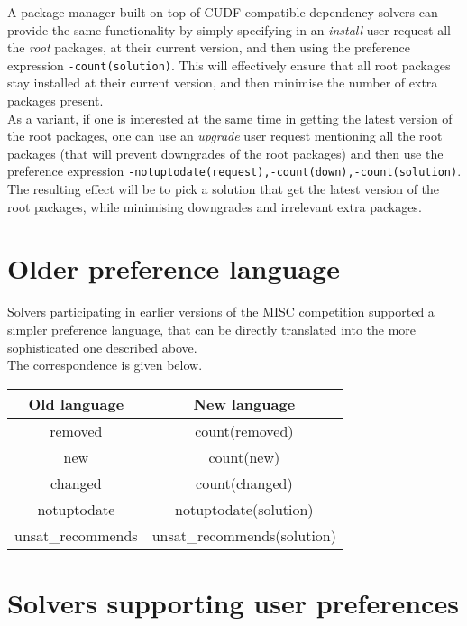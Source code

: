 \documentclass{article}
\begin{document}
A package manager built on top of CUDF-compatible dependency solvers can provide
the same functionality by simply specifying in an \emph{install} user request all the
\emph{root} packages, at their current version, and then using the preference
expression \texttt{-count(solution)}. 
%
This will effectively ensure that all root packages stay installed at their
current version, and then minimise the number of extra packages present.\\

As a variant, if one is interested at the same time in getting the latest version
of the root packages, one can use an \emph{upgrade} user request mentioning
all the root packages (that will prevent downgrades of the root packages) and
then use the preference expression \texttt{-notuptodate(request),-count(down),-count(solution)}.
The resulting effect will be to pick a solution that get the latest version
of the root packages, while minimising downgrades and irrelevant extra packages.

\section{Older preference language}

Solvers participating in earlier versions of the MISC competition supported a simpler preference language,
that can be directly translated into the more sophisticated one described above.\\

The correspondence is given below.\\

\begin{center}
\begin{tabular}{|c|c|}
\hline
Old language & New language \\\hline
removed     & count(removed) \\
new         & count(new) \\
changed     & count(changed) \\
notuptodate & notuptodate(solution)\\
unsat\_recommends & unsat\_recommends(solution)\\\hline
\end{tabular}
\end{center}


\section{Solvers supporting user preferences}
\end{document}
